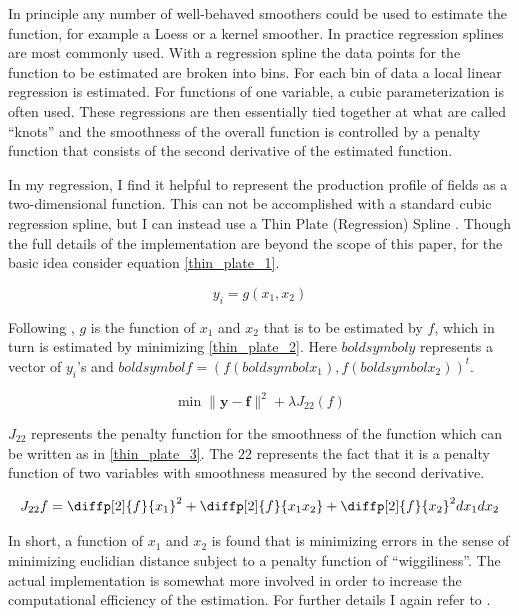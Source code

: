 \documentclass[12pt]{article}
\begin{document}
In principle any number of well-behaved smoothers could be used to estimate the function, for example a Loess or a kernel smoother.  In practice regression splines are most commonly used.  With a regression spline the data points for the function to be estimated are broken into bins.  For each bin of data a local linear regression is estimated.  For functions of one variable, a cubic parameterization is often used.  These regressions are then essentially tied together at what are called “knots” and the smoothness of the overall function is controlled by a penalty function that consists of the second derivative of the estimated function.

In my regression, I find it helpful to represent the production profile of fields as a two-dimensional function.  This can not be accomplished with a standard cubic regression spline, but I can instead use a Thin Plate (Regression) Spline \citet{wood_thin_2003}.  Though the full details of the implementation are beyond the scope of this paper, for the basic idea consider equation \ref{thin_plate_1}.  

	\begin{equation}
	y_i = g(x_1, x_2)
	\label{thin_plate_1}
	\end{equation}

Following \citet{wood_generalized_2006}, $g$ is the function of $x_1$ and $x_2$ that is to be estimated by $f$, which in turn is estimated by minimizing \ref{thin_plate_2}.  Here $boldsymbol{y}$ represents a vector of $y_i$’s and $boldsymbol{f} = (f(boldsymbol{x_1}),f(boldsymbol{x_2}))^t$.   

	\begin{equation}
\min \|\boldsymbol{y-f}\|^2 + \lambda J_{22}(f)
\label{thin_plate_2}
	\end{equation}

$J_{22}$ represents the penalty function for the smoothness of the function which can be written as in \ref{thin_plate_3}.  The $22$ represents the fact that it is a penalty function of two variables with smoothness measured by the second derivative.

	\begin{equation}
	J_{22}{f}= \diffp[2]{f}{x_1}^2 + \diffp[2]{f}{{x_1}{x_2}} + \diffp[2]{f}{x_2}^2dx_1 dx_2
\label{thin_plate_3}
	\end{equation}

In short, a function of $x_1$ and $x_2$ is found that is minimizing errors in the sense of minimizing euclidian distance subject to a penalty function of “wiggiliness”.  The actual implementation is somewhat more involved in order to increase the computational efficiency of the estimation.  For further details I again refer to \citet{wood_thin_2003}.
\end{document}
